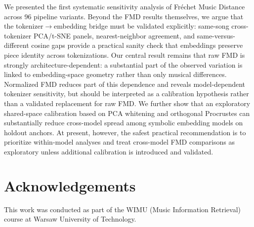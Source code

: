 \documentclass[a4paper]{article}
\begin{document}
We presented the first systematic sensitivity analysis of Fréchet Music Distance across 96 pipeline variants. Beyond the FMD results themselves, we argue that the tokenizer$\rightarrow$embedding bridge must be validated explicitly: same-song cross-tokenizer PCA/t-SNE panels, nearest-neighbor agreement, and same-versus-different cosine gaps provide a practical sanity check that embeddings preserve piece identity across tokenizations. Our central result remains that raw FMD is strongly architecture-dependent: a substantial part of the observed variation is linked to embedding-space geometry rather than only musical differences. Normalized FMD reduces part of this dependence and reveals model-dependent tokenizer sensitivity, but should be interpreted as a calibration hypothesis rather than a validated replacement for raw FMD. We further show that an exploratory shared-space calibration based on PCA whitening and orthogonal Procrustes can substantially reduce cross-model spread among symbolic embedding models on holdout anchors. At present, however, the safest practical recommendation is to prioritize within-model analyses and treat cross-model FMD comparisons as exploratory unless additional calibration is introduced and validated.

\section*{Acknowledgements}

This work was conducted as part of the WIMU (Music Information Retrieval) course at Warsaw University of Technology.



\end{document}
